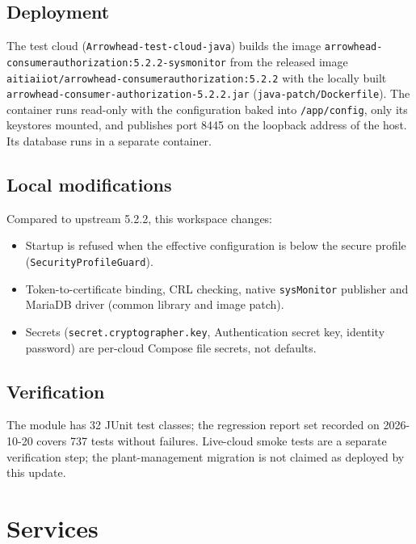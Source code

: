 \documentclass[a4paper]{arrowhead}
\begin{document}
\subsection{Deployment}

The test cloud (\texttt{Arrowhead-test-cloud-java}) builds the image \texttt{arrowhead-\allowbreak{}consumerauthorization:5.\allowbreak{}2.\allowbreak{}2-\allowbreak{}sysmonitor} from the released image \texttt{aitiaiiot/\allowbreak{}arrowhead-\allowbreak{}consumerauthorization:5.\allowbreak{}2.\allowbreak{}2} with the locally built \texttt{arrowhead-\allowbreak{}consumer-\allowbreak{}authorization-\allowbreak{}5.\allowbreak{}2.\allowbreak{}2.\allowbreak{}jar} (\texttt{java-patch/Dockerfile}). The container runs read-only with the configuration baked into \texttt{/app/config}, only its keystores mounted, and publishes port 8445 on the loopback address of the host. Its database runs in a separate container.

\subsection{Local modifications}
\label{sec:local}

Compared to upstream 5.2.2, this workspace changes:
\begin{itemize}
  \item Startup is refused when the effective configuration is below the secure profile (\texttt{Security\allowbreak{}Profile\allowbreak{}Guard}).
  \item Token-to-certificate binding, CRL checking, native \texttt{sysMonitor} publisher and MariaDB driver (common library and image patch).
  \item Secrets (\texttt{secret.\allowbreak{}cryptographer.\allowbreak{}key}, Authentication secret key, identity password) are per-cloud Compose file secrets, not defaults.
\end{itemize}

\subsection{Verification}

The module has 32 JUnit test classes; the regression report set recorded on 2026-10-20 covers 737 tests without failures. Live-cloud smoke tests are a separate verification step; the plant-management migration is not claimed as deployed by this update.

\newpage

\section{Services}
\label{sec:services}
\end{document}
